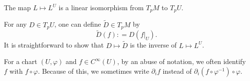 \documentclass{ximera}
\begin{document}
    \begin{proposition} The map $L \mapsto L^U$ is a linear isomorphism from $T_pM$ to $T_pU$.
    
    \begin{solution}
        For any $D \in T_pU$, one can define $\tilde{D} \in T_pM$ by
        \[      \tilde{D} (f) : = D (f \vert _ U ).                 \]
        It is straightforward to show that $D \mapsto \tilde{D}$ is the inverse of $L \mapsto L^U$.
    \end{solution}
\end{proposition}


    \begin{remark}
        For a chart $(U , \varphi ) $ and $f \in C^{\infty}(U)$, by an abuse of notation, we often identify $f$ with $f \circ \varphi$. Because of this, we sometimes  write $\partial_i f$ instead of $\partial _i (f \circ \varphi ^{-1} ) \circ \varphi $. 
    \end{remark}
\end{document}

